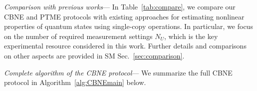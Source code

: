 \documentclass[aps,prl,twocolumn,nofootinbib,superscriptaddress,10pt]{revtex4-2}
\DeclareMathOperator{\Tr}{tr}
\theoremstyle{plain}
\theoremstyle{definition}
\begin{document}

\emph{Comparison with previous works}--- 
In Table~\ref{tab:compare}, we compare our CBNE and PTME protocols with existing approaches for estimating nonlinear properties of quantum states using single-copy operations. 
In particular, we focus on the number of required measurement settings \(N_U\), which is the key experimental resource considered in this work. 
Further details and comparisons on other aspects are provided in SM Sec.~\ref{sec:comparison}.

\emph{Complete algorithm of the CBNE protocol}--- 
We summarize the full CBNE protocol in Algorithm~\ref{alg:CBNEmain} below. 
\end{document}
